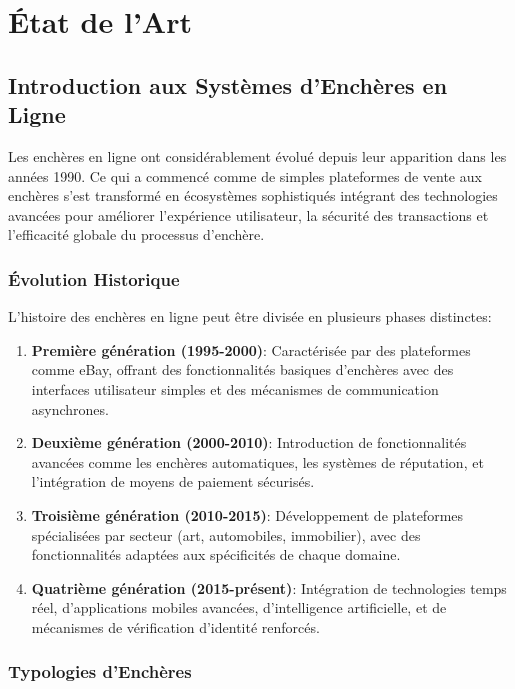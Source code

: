\chapter{État de l'Art}

\section{Introduction aux Systèmes d'Enchères en Ligne}

Les enchères en ligne ont considérablement évolué depuis leur apparition dans les années 1990. Ce qui a commencé comme de simples plateformes de vente aux enchères s'est transformé en écosystèmes sophistiqués intégrant des technologies avancées pour améliorer l'expérience utilisateur, la sécurité des transactions et l'efficacité globale du processus d'enchère.

\subsection{Évolution Historique}

L'histoire des enchères en ligne peut être divisée en plusieurs phases distinctes:

\begin{enumerate}
    \item \textbf{Première génération (1995-2000)}: Caractérisée par des plateformes comme eBay, offrant des fonctionnalités basiques d'enchères avec des interfaces utilisateur simples et des mécanismes de communication asynchrones.
    
    \item \textbf{Deuxième génération (2000-2010)}: Introduction de fonctionnalités avancées comme les enchères automatiques, les systèmes de réputation, et l'intégration de moyens de paiement sécurisés.
    
    \item \textbf{Troisième génération (2010-2015)}: Développement de plateformes spécialisées par secteur (art, automobiles, immobilier), avec des fonctionnalités adaptées aux spécificités de chaque domaine.
    
    \item \textbf{Quatrième génération (2015-présent)}: Intégration de technologies temps réel, d'applications mobiles avancées, d'intelligence artificielle, et de mécanismes de vérification d'identité renforcés.
\end{enumerate}

\subsection{Typologies d'Enchères}

